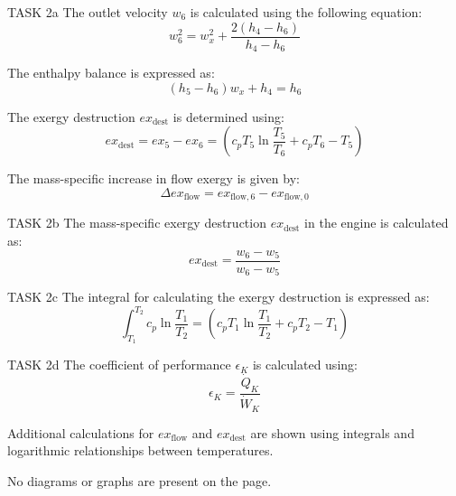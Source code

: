 TASK 2a  
The outlet velocity \( w_6 \) is calculated using the following equation:  
\[
w_6^2 = w_x^2 + \frac{2(h_4 - h_6)}{h_4 - h_6}
\]

The enthalpy balance is expressed as:  
\[
(h_5 - h_6)w_x + h_4 = h_6
\]

The exergy destruction \( ex_{\text{dest}} \) is determined using:  
\[
ex_{\text{dest}} = ex_5 - ex_6 = (c_p T_5 \ln \frac{T_5}{T_6} + c_p T_6 - T_5)
\]

The mass-specific increase in flow exergy is given by:  
\[
\Delta ex_{\text{flow}} = ex_{\text{flow},6} - ex_{\text{flow},0}
\]

TASK 2b  
The mass-specific exergy destruction \( ex_{\text{dest}} \) in the engine is calculated as:  
\[
ex_{\text{dest}} = \frac{w_6 - w_5}{w_6 - w_5}
\]

TASK 2c  
The integral for calculating the exergy destruction is expressed as:  
\[
\int_{T_1}^{T_2} c_p \ln \frac{T_1}{T_2} = (c_p T_1 \ln \frac{T_1}{T_2} + c_p T_2 - T_1)
\]

TASK 2d  
The coefficient of performance \( \epsilon_K \) is calculated using:  
\[
\epsilon_K = \frac{\dot{Q}_K}{\dot{W}_K}
\]

Additional calculations for \( ex_{\text{flow}} \) and \( ex_{\text{dest}} \) are shown using integrals and logarithmic relationships between temperatures.  

No diagrams or graphs are present on the page.